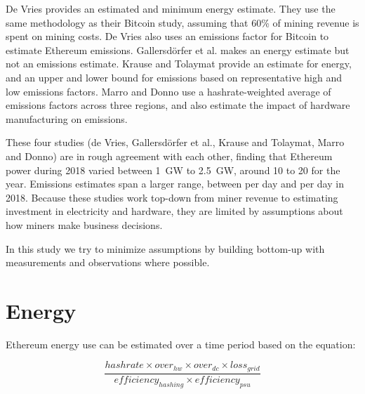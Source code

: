 De Vries provides an estimated and minimum energy estimate. They use the same methodology as their Bitcoin study, assuming that 60\% of mining revenue is spent on mining costs. De Vries also uses an emissions factor for Bitcoin to estimate Ethereum emissions. Gallersdörfer et al. makes an energy estimate but not an emissions estimate. Krause and Tolaymat provide an estimate for energy, and an upper and lower bound for emissions based on representative high and low emissions factors. Marro and Donno use a hashrate-weighted average of emissions factors across three regions, and also estimate the impact of hardware manufacturing on emissions.

These four studies (de Vries, Gallersdörfer et al., Krause and Tolaymat, Marro and Donno) are in rough agreement with each other, finding that Ethereum power during 2018 varied between \SI{1}{\giga\watt} to \SI{2.5}{\giga\watt}, around \SI{10}{\TWh} to \SI{20}{\TWh} for the year. Emissions estimates span a larger range, between  per day and  per day in 2018. Because these studies work top-down from miner revenue to estimating investment in electricity and hardware, they are limited by assumptions about how miners make business decisions.

In this study we try to minimize assumptions by building bottom-up with measurements and observations where possible.

\section{Energy}

Ethereum energy use can be estimated over a time period based on the equation:

\newcommand{\hashrate}{\mathit{hashrate}}
\newcommand{\hardwareoverhead}{\mathit{over}_\mathit{hw}}
\newcommand{\gridloss}{\mathit{loss}_\mathit{grid}}
\newcommand{\hashingefficiency}{\mathit{efficiency}_\mathit{hashing}}
\newcommand{\datacenteroverhead}{\mathit{over}_\mathit{dc}}
\newcommand{\powersupplyefficiency}{\mathit{efficiency}_\mathit{psu}}

\begin{equation} \label{eq:1}
\frac{\hashrate \times \hardwareoverhead \times \datacenteroverhead \times \gridloss}{\hashingefficiency \times \powersupplyefficiency}
\end{equation}


